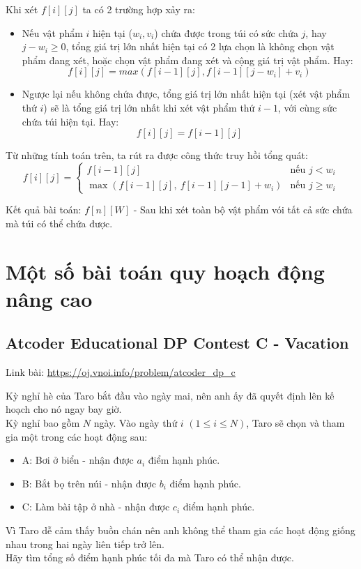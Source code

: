 \documentclass{article}
\begin{document}
Khi xét $f[i][j]$ ta có 2 trường hợp xảy ra:
\begin{itemize}
    \item Nếu vật phẩm $i$ hiện tại (\(w_i, v_i\)) chứa được trong túi có sức chứa $j$, hay $j - w_i \geq 0$, tổng giá trị lớn nhất hiện tại có 2 lựa chọn là không chọn vật phẩm đang xét, hoặc chọn vật phẩm đang xét và cộng giá trị vật phẩm. Hay:
    \[
    f[i][j] = max(f[i - 1][j], f[i - 1][j - w_i] + v_i)
    \]
    \item Ngược lại nếu không chứa được, tổng giá trị lớn nhất hiện tại (xét vật phẩm thứ $i$) sẽ là tổng giá trị lớn nhất khi xét vật phẩm thứ $i - 1$, với cùng sức chứa túi hiện tại. Hay:
    \[
    f[i][j] = f[i - 1][j]
    \]
\end{itemize}

Từ những tính toán trên, ta rút ra được công thức truy hồi tổng quát:
\[
f[i][j] =
\begin{cases}
    f[i - 1][j] & \text{nếu } j < w_i \\
    \max(f[i - 1][j],\ f[i - 1][j - 1] + w_i) & \text{nếu } j \geq w_i
\end{cases}
\]

Kết quả bài toán: $f[n][W]$ - Sau khi xét toàn bộ vật phẩm vói tất cả sức chứa mà túi có thể chứa được.
\section{Một số bài toán quy hoạch động nâng cao}

\subsection{Atcoder Educational DP Contest C - Vacation
}
Link bài: \url{https://oj.vnoi.info/problem/atcoder_dp_c}

\begin{tcolorbox}[
    colback=blue!5,        %
    colframe=blue!75!black,%
    title={Đề bài}
]
Kỳ nghỉ hè của Taro bắt đầu vào ngày mai, nên anh ấy đã quyết định lên kế hoạch cho nó ngay bay giờ.\\

Kỳ nghỉ bao gồm $N$ ngày. Vào ngày thứ $i$ $(1 \leq i \leq N)$, Taro sẽ chọn và tham gia một trong các hoạt động sau:
\begin{itemize}
    \item A: Bơi ở biển - nhận được $a_i$ điểm hạnh phúc.
    \item B: Bắt bọ trên núi - nhận được $b_i$ điểm hạnh phúc.
    \item C: Làm bài tập ở nhà - nhận được $c_i$ điểm hạnh phúc.
\end{itemize}

Vì Taro dễ cảm thấy buồn chán nên anh không thể tham gia các hoạt động giống nhau trong hai ngày liên tiếp trở lên.
\\
Hãy tìm tổng số điểm hạnh phúc tối đa mà Taro có thể nhận được.
\end{tcolorbox}
\end{document}
